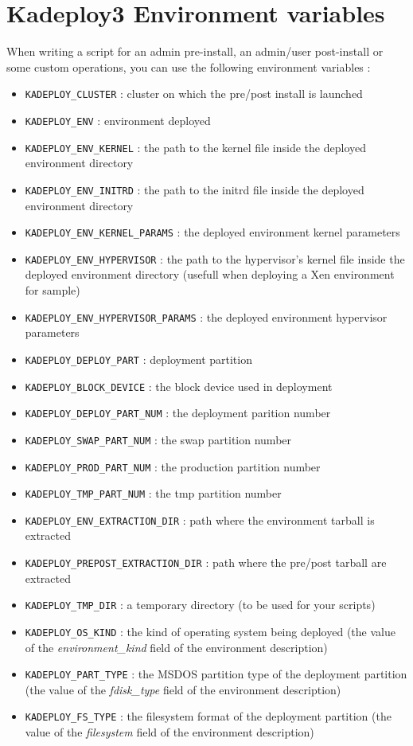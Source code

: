 \documentclass[a4wide,10pt,oneside]{book}
\begin{document}
\section{Kadeploy3 Environment variables}\label{sec:env_vars}
When writing a script for an admin pre-install, an admin/user post-install or some custom operations, you can use the following environment variables :
\begin{itemize}
\item \texttt{KADEPLOY\_CLUSTER} : cluster on which the pre/post install is launched
\item \texttt{KADEPLOY\_ENV} : environment deployed
\item \texttt{KADEPLOY\_ENV\_KERNEL} : the path to the kernel file inside the deployed environment directory
\item \texttt{KADEPLOY\_ENV\_INITRD} : the path to the initrd file inside the deployed environment directory
\item \texttt{KADEPLOY\_ENV\_KERNEL\_PARAMS} : the deployed environment kernel parameters
\item \texttt{KADEPLOY\_ENV\_HYPERVISOR} : the path to the hypervisor's kernel file inside the deployed environment directory (usefull when deploying a Xen environment for sample)
\item \texttt{KADEPLOY\_ENV\_HYPERVISOR\_PARAMS} : the deployed environment hypervisor parameters
\item \texttt{KADEPLOY\_DEPLOY\_PART} : deployment partition
\item \texttt{KADEPLOY\_BLOCK\_DEVICE} : the block device used in deployment
\item \texttt{KADEPLOY\_DEPLOY\_PART\_NUM} : the deployment parition number
\item \texttt{KADEPLOY\_SWAP\_PART\_NUM} : the swap partition number
\item \texttt{KADEPLOY\_PROD\_PART\_NUM} : the production partition number
\item \texttt{KADEPLOY\_TMP\_PART\_NUM} : the tmp partition number
\item \texttt{KADEPLOY\_ENV\_EXTRACTION\_DIR} : path where the environment tarball is extracted
\item \texttt{KADEPLOY\_PREPOST\_EXTRACTION\_DIR} : path where the pre/post tarball are extracted
\item \texttt{KADEPLOY\_TMP\_DIR} : a temporary directory (to be used for your scripts)
\item \texttt{KADEPLOY\_OS\_KIND} : the kind of operating system being deployed (the value of the \emph{environment\_kind} field of the environment description)
\item \texttt{KADEPLOY\_PART\_TYPE} : the MSDOS partition type of the deployment partition (the value of the \emph{fdisk\_type} field of the environment description)
\item \texttt{KADEPLOY\_FS\_TYPE} : the filesystem format of the deployment partition (the value of the \emph{filesystem} field of the environment description)
\end{itemize}
\end{document}
